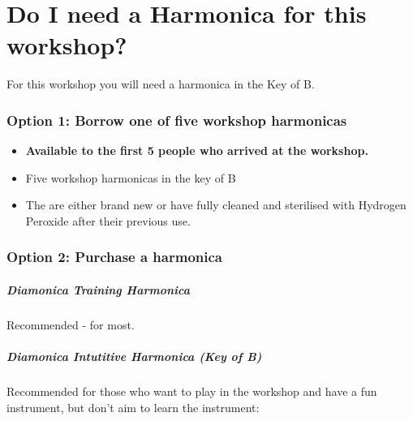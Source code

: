 \part*{Do I need a Harmonica for this workshop?}
For this workshop you will need a harmonica in the Key of B.

\section*{Option 1: Borrow one of five workshop harmonicas}
    \begin{itemize}
        \item \textbf{Available to the first 5 people who arrived at the workshop.}
        \item Five workshop harmonicas in the key of B
        \item The are either brand new or have fully cleaned and sterilised with Hydrogen Peroxide after their previous use.
    \end{itemize}
    
\section*{Option 2: Purchase a harmonica} %
        \subsubsection*{Diamonica Training Harmonica}
        Recommended - for most.
            
                \subsubsection*{Diamonica \textbf{Intutitive Harmonica} (Key of B)}
        Recommended for those who want to play in the workshop and have a fun instrument, but don't aim to learn the instrument:
        
